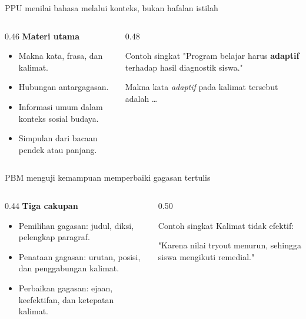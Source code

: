 \begin{frame}{PPU menilai bahasa melalui konteks, bukan hafalan istilah}
  \begin{columns}[T,onlytextwidth]
    \begin{column}{0.46\textwidth}
      {\color{StudentBlue}\bfseries Materi utama}\par
      \begin{itemize}
        \item Makna kata, frasa, dan kalimat.
        \item Hubungan antargagasan.
        \item Informasi umum dalam konteks sosial budaya.
        \item Simpulan dari bacaan pendek atau panjang.
      \end{itemize}
    \end{column}
    \begin{column}{0.48\textwidth}
      \begin{block}{Contoh singkat}
        "Program belajar harus \textbf{adaptif} terhadap hasil diagnostik siswa."

        Makna kata \textit{adaptif} pada kalimat tersebut adalah \ldots

      \end{block}
    \end{column}
  \end{columns}
\end{frame}

\begin{frame}{PBM menguji kemampuan memperbaiki gagasan tertulis}
  \begin{columns}[T,onlytextwidth]
    \begin{column}{0.44\textwidth}
      {\color{StudentBlue}\bfseries Tiga cakupan}\par
      \begin{itemize}
        \item Pemilihan gagasan: judul, diksi, pelengkap paragraf.
        \item Penataan gagasan: urutan, posisi, dan penggabungan kalimat.
        \item Perbaikan gagasan: ejaan, keefektifan, dan ketepatan kalimat.
      \end{itemize}
    \end{column}
    \begin{column}{0.50\textwidth}
      \begin{block}{Contoh singkat}
        Kalimat tidak efektif:

        "Karena nilai tryout menurun, sehingga siswa mengikuti remedial."

      \end{block}
    \end{column}
  \end{columns}
\end{frame}

